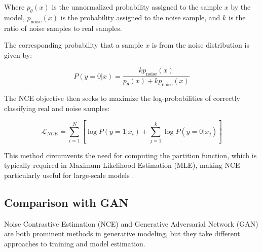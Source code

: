 Where \( p_{\theta}(x) \) is the unnormalized probability assigned to the sample \( x \) by the model, \( p_{\text{noise}}(x) \) is the probability assigned to the noise sample, and \( k \) is the ratio of noise samples to real samples.

The corresponding probability that a sample \( x \) is from the noise distribution is given by:

\begin{equation}
P(y = 0 | x) = \frac{k p_{\text{noise}}(x)}{p_{\theta}(x) + k p_{\text{noise}}(x)}
\end{equation}

The NCE objective then seeks to maximize the log-probabilities of correctly classifying real and noise samples:

\begin{equation}
\mathcal{L}_{NCE} = \sum_{i=1}^{N} \left[ \log P(y=1 | x_i) + \sum_{j=1}^{k} \log P(y=0 | x_j) \right]
\end{equation}

This method circumvents the need for computing the partition function, which is typically required in Maximum Likelihood Estimation (MLE), making NCE particularly useful for large-scale models \citep{10.48550/arxiv.2110.11271}.

\subsection{Comparison with GAN}

Noise Contrastive Estimation (NCE) and Generative Adversarial Network (GAN) are both prominent methods in generative modeling, but they take different approaches to training and model estimation.

